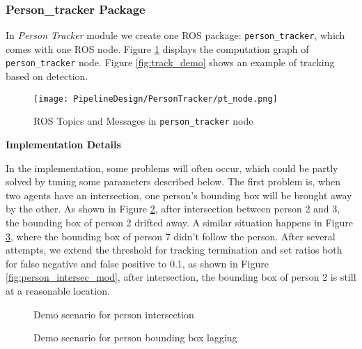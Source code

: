 \subsubsection{Person\_tracker Package} 

In \textit{Person Tracker} module we create one ROS package: \texttt{person\_tracker}, which comes with one ROS node. Figure \ref{fig:pt_node} displays the computation graph of \texttt{person\_tracker} node.
Figure \ref{fig:track_demo} shows an example of tracking based on detection.

\begin{figure}[H]
  \centering
  \texttt{[image: PipelineDesign/PersonTracker/pt\_node.png]}
  \caption{ROS Topics and Messages in \texttt{person\_tracker} node}
  \label{fig:pt_node}
\end{figure} 

\textbf{Implementation Details}

In the implementation, some problems will often occur, which could be partly solved by tuning some parameters described below. The first problem is, when two agents have an intersection, one person's bounding box will be brought away by the other. As shown in Figure \ref{fig:person_intersec}, after intersection between person 2 and 3, the bounding box of person 2 drifted away. A similar situation happens in Figure \ref{fig:bbox_lag}, where the bounding box of person 7 didn't follow the person.
After several attempts, we extend the threshold for tracking termination and set ratios both for false negative and false positive to 0.1, as shown in Figure \ref{fig:person_intersec_mod}, after intersection, the bounding box of person 2 is still at a reasonable location.

\begin{figure}[H]
  \centering
  \caption{Demo scenario for person intersection}
  \label{fig:person_intersec}
\end{figure} 

\begin{figure}[H]
  \centering
  \caption{Demo scenario for person bounding box lagging}
  \label{fig:bbox_lag}
\end{figure} 

